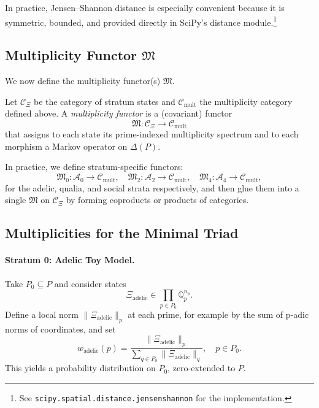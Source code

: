 \documentclass[11pt]{article}
\begin{document}
In practice, Jensen--Shannon distance is especially convenient because it is symmetric, bounded, and provided directly in SciPy's distance module.\footnote{See \texttt{scipy.spatial.distance.jensenshannon} for the implementation.}

\subsection{Multiplicity Functor \(\mathfrak{M}\)}

We now define the multiplicity functor(s) \(\mathfrak{M}\).

\begin{definition}
Let \(\mathcal{C}_\Xi\) be the category of stratum states and \(\mathcal{C}_{\mathrm{mult}}\) the multiplicity category defined above. A \emph{multiplicity functor} is a (covariant) functor
\[
  \mathfrak{M} : \mathcal{C}_\Xi \to \mathcal{C}_{\mathrm{mult}}
\]
that assigns to each state its prime-indexed multiplicity spectrum and to each morphism a Markov operator on \(\Delta(P)\).
\end{definition}

In practice, we define stratum-specific functors:
\[
  \mathfrak{M}_0 : \mathcal{A}_0 \to \mathcal{C}_{\mathrm{mult}},\quad
  \mathfrak{M}_2 : \mathcal{A}_2 \to \mathcal{C}_{\mathrm{mult}},\quad
  \mathfrak{M}_4 : \mathcal{A}_4 \to \mathcal{C}_{\mathrm{mult}},
\]
for the adelic, qualia, and social strata respectively, and then glue them into a single \(\mathfrak{M}\) on \(\mathcal{C}_\Xi\) by forming coproducts or products of categories.

\subsection{Multiplicities for the Minimal Triad}

\paragraph{Stratum 0: Adelic Toy Model.}
Take \(P_0 \subseteq P\) and consider states
\[
  \Xi_{\text{adelic}} \in \prod_{p \in P_0} \mathbb{Q}_p^{n_p}.
\]
Define a local norm \(\|\Xi_{\text{adelic}}\|_p\) at each prime, for example by the sum of p-adic norms of coordinates, and set
\[
  w_{\text{adelic}}(p) = \frac{\|\Xi_{\text{adelic}}\|_p}{\sum_{q\in P_0} \|\Xi_{\text{adelic}}\|_q},\quad p \in P_0.
\]
This yields a probability distribution on \(P_0\), zero-extended to \(P\).
\end{document}
